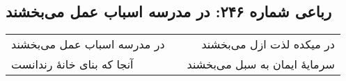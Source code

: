 \begin{center}
\section*{رباعی شماره ۲۴۶: در مدرسه اسباب عمل می‌بخشند}
\label{sec:sh246}
\begin{longtable}{l p{0.5cm} r}
در مدرسه اسباب عمل می‌بخشند
&&
در میکده لذت ازل می‌بخشند
\\
آنجا که بنای خانهٔ رندانست
&&
سرمایهٔ ایمان به سبل می‌بخشند
\\
\end{longtable}
\end{center}
